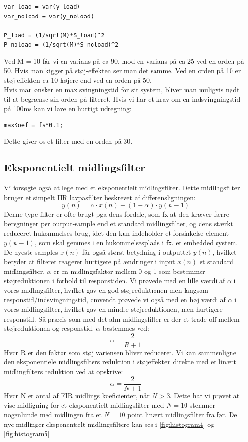 \documentclass[12pt]{article}
\begin{document}
\begin{lstlisting}[frame=single]  
var_load = var(y_load)
var_noload = var(y_noload)

P_load = (1/sqrt(M)*S_load)^2
P_noload = (1/sqrt(M)*S_noload)^2
\end{lstlisting}

Ved M = 10 får vi en varians på ca 90, mod en varians på ca 25 ved en orden på 50. Hvis man kigger på støj-effekten ser man det samme. Ved en orden på 10 er støj-effekten ca 10 højere end ved en orden på 50.\\

Hvis man ønsker en max svingningstid for sit system, bliver man muligvis nødt til at begrænse sin orden på filteret. Hvis vi har et krav om en indsvingningstid på 100ms kan vi lave en hurtigt udregning:

\begin{lstlisting}[frame=single] 
maxKoef = fs*0.1;
\end{lstlisting}

Dette giver os et filter med en orden på 30. 
\newpage

\subsection{Eksponentielt midlingsfilter}
Vi forsøgte også at lege med et eksponentielt midlingsfilter. Dette midlingsfilter bruger et
simpelt IIR lavpasfilter beskrevet af differensligningen:
\[ y(n)= \alpha \cdot x(n)+(1-\alpha)\cdot y(n-1) \]
Denne type filter er ofte brugt pga dens fordele, som fx at den kræver færre beregninger per output-sample end et standard midlingsfilter, og dens stærkt reduceret hukommelses brug, idet den kun indeholder et forsinkelse element $y(n-1)$, som skal gemmes i en hukommelsesplads i fx. et embedded system. De nyeste samples $x(n)$ får også størst betydning i outputtet $y(n)$, hvilket betyder at filteret reagerer hurtigere på ændringer i input $x(n)$ et standard midlingsfilter. 
\newline
$\alpha$ er en midlingsfaktor mellem 0 og 1 som bestemmer støjreduktionen i forhold til responstiden. Vi prøvede med en lille værdi af $\alpha$ i vores midlingsfilter, hvilket gav en god støjreduktionen men langsom responstid/indsvingningstid, omvendt prøvede vi også med en høj værdi af $\alpha$ i vores midlingsfilter, hvilket gav en mindre støjreduktionen, men hurtigere responstid. Så præcis som med det alm midlingsfilter er der et trade off mellem støjreduktionen og responstid.
\newline
$\alpha$ bestemmes ved:
\[ \alpha = \dfrac{2}{R+1} \]
Hvor R er den faktor som støj variensen bliver reduceret. Vi kan sammenligne den eksponentiele midlingsfilters reduktion i støjeffekten direkte med et linært midlingfilters reduktion ved at opskrive:
\[ \alpha = \dfrac{2}{N+1}\]
Hvor N er antal af FIR midlings koeficienter, når $N>3$. Dette har vi prøvet at vise midligning for et eksponentielt midlingsfilter med $N=10$ stemmer nogenlunde med midlingen fra et $N=10$ point linært midlingsfilter fra før. De nye midlinger eksponentielt midlingsfiltere kan ses i \autoref{fig:histogram4} og \autoref{fig:histogram5}
\end{document}
